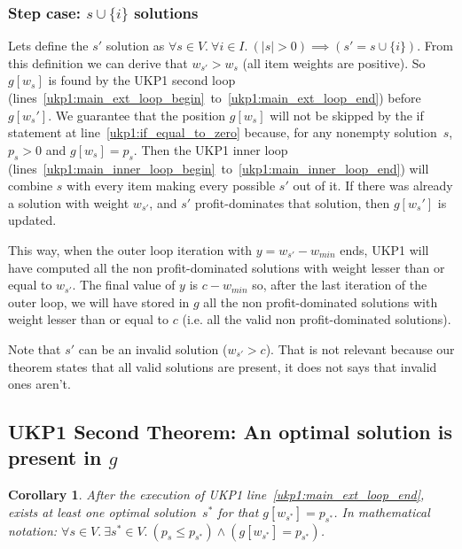 \documentclass[12pt]{article}
\newtheorem{corollary}{Corollary}
\begin{document}
\subsubsection{Step case: \(s \cup \{i\}\) solutions}
\label{ukp1:step_case_proof}

Lets define the \(s'\) solution as \(\forall s \in V.~\forall i \in I.~(|s| > 0) \implies (s' = s \cup \{i\})\). From this definition we can derive that \(w_{s'} > w_s\) (all item weights are positive). So \(g[w_s]\) is found by the UKP1 second loop (lines~\ref{ukp1:main_ext_loop_begin}~to~\ref{ukp1:main_ext_loop_end}) before \(g[w_s']\). We guarantee that the position \(g[w_s]\) will not be skipped by the if statement at line~\ref{ukp1:if_equal_to_zero} because, for any nonempty solution~\(s\), \(p_s > 0\) and \(g[w_s] = p_s\). Then the UKP1 inner loop (lines~\ref{ukp1:main_inner_loop_begin}~to~\ref{ukp1:main_inner_loop_end}) will combine \(s\) with every item making every possible \(s'\) out of it. If there was already a solution with weight \(w_{s'}\), and \(s'\) profit-dominates that solution, then \(g[w_s']\) is updated.

This way, when the outer loop iteration with \(y = w_{s'}-w_{min}\) ends, UKP1 will have computed all the non profit-dominated solutions with weight lesser than or equal to \(w_{s'}\). The final value of \(y\) is \(c-w_{min}\) so, after the last iteration of the outer loop, we will have stored in \(g\) all the non profit-dominated solutions with weight lesser than or equal to \(c\) (i.e. all the valid non profit-dominated solutions).

Note that \(s'\) can be an invalid solution (\(w_{s'} > c\)). That is not relevant because our theorem states that all valid solutions are present, it does not says that invalid ones aren't.

\subsection{UKP1 Second Theorem: An optimal solution is present in \(g\)}

\begin{corollary}\label{theo:ukp1:opt_is_present}
After the execution of UKP1 line~\ref{ukp1:main_ext_loop_end}, exists at least one optimal solution~\(s^*\) for that \(g[w_{s^*}] = p_{s^*}\). In mathematical notation: \(\forall s \in V.~\exists s^* \in V.~(p_{s} \leq p_{s^*}) \land (g[w_{s^*}] = p_{s^*})\).
\end{corollary}
\end{document}
